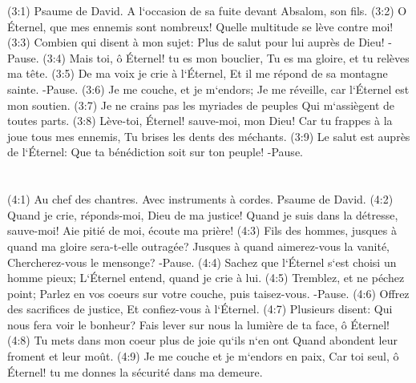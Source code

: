 \verse (3:1) Psaume de David. A l`occasion de sa fuite devant Absalom, son fils. (3:2) O Éternel, que mes ennemis sont nombreux! Quelle multitude se lève contre moi! 
\verse (3:3) Combien qui disent à mon sujet: Plus de salut pour lui auprès de Dieu! -Pause. 
\verse (3:4) Mais toi, ô Éternel! tu es mon bouclier, Tu es ma gloire, et tu relèves ma tête. 
\verse (3:5) De ma voix je crie à l`Éternel, Et il me répond de sa montagne sainte. -Pause. 
\verse (3:6) Je me couche, et je m`endors; Je me réveille, car l`Éternel est mon soutien. 
\verse (3:7) Je ne crains pas les myriades de peuples Qui m`assiègent de toutes parts. 
\verse (3:8) Lève-toi, Éternel! sauve-moi, mon Dieu! Car tu frappes à la joue tous mes ennemis, Tu brises les dents des méchants. 
\verse (3:9) Le salut est auprès de l`Éternel: Que ta bénédiction soit sur ton peuple! -Pause. 

\chapter{}

\verse (4:1) Au chef des chantres. Avec instruments à cordes. Psaume de David. (4:2) Quand je crie, réponds-moi, Dieu de ma justice! Quand je suis dans la détresse, sauve-moi! Aie pitié de moi, écoute ma prière! 
\verse (4:3) Fils des hommes, jusques à quand ma gloire sera-t-elle outragée? Jusques à quand aimerez-vous la vanité, Chercherez-vous le mensonge? -Pause. 
\verse (4:4) Sachez que l`Éternel s`est choisi un homme pieux; L`Éternel entend, quand je crie à lui. 
\verse (4:5) Tremblez, et ne péchez point; Parlez en vos coeurs sur votre couche, puis taisez-vous. -Pause. 
\verse (4:6) Offrez des sacrifices de justice, Et confiez-vous à l`Éternel. 
\verse (4:7) Plusieurs disent: Qui nous fera voir le bonheur? Fais lever sur nous la lumière de ta face, ô Éternel! 
\verse (4:8) Tu mets dans mon coeur plus de joie qu`ils n`en ont Quand abondent leur froment et leur moût. 
\verse (4:9) Je me couche et je m`endors en paix, Car toi seul, ô Éternel! tu me donnes la sécurité dans ma demeure. 

\chapter{}

